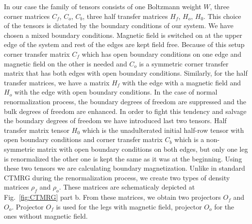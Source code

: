 \documentclass[showpacs,amssymb,twocolumn,floatfix,aps,pre,notitlepage]{revtex4-2}
\begin{document}
In our case the family of tensors consists of one Boltzmann weight $W$, three corner matrices $C_f$, $C_o$, $C_b$, three half transfer matrices $H_f$, $H_o$, $H_0$. This choice of the tensors is dictated by the boundary conditions of our system. We have chosen a mixed boundary conditions. Magnetic field is switched on at the upper edge of the system and rest of the edges are kept field free. Because of this setup corner transfer matrix $C_f$ which has open boundary conditions on one edge and magnetic field on the other is needed and $C_o$ is a symmetric corner transfer matrix that has both edges with open boundary conditions. Similarly, for the half transfer matrices, we have a matrix $H_f$ with the edge with a magnetic field and $H_o$ with the edge with open boundary conditions. In the case of normal renormalization process, the boundary degrees of freedom are suppressed  and the bulk degrees of freedom are enhanced. In order to fight this tendency and salvage the boundary degrees of freedom we have introduced last two tensors. Half transfer matrix tensor $H_0$ which is the unadulterated initial half-row tensor with open boundary conditions and corner transfer matrix $C_b$ which is a non-symmetric matrix with open boundary conditions on both edges, but only one leg is renormalized the other one is kept the same as it was at the beginning. Using these two tensors we are calculating boundary magnetization. Unlike in standard CTMRG during the renormalization process, we create two types of density matrices $\rho_f$ and $\rho_o$. These matrices are schematicaly depicted at Fig.~\ref{fig:CTMRG} part b. From these matrices, we obtain two projectors $O_f$ and $O_o$. Projector $O_f$ is used for the legs with magnetic field, projector $O_o$ for the ones without magnetic field. 
\end{document}
